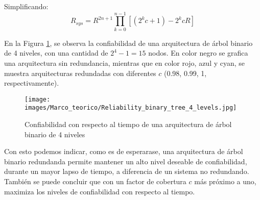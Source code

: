 Simplificando: $$R_{sys} = R^{2n +1} \prod_{k=0}^{n-1}{[(2^kc+1) - 2^kcR]}$$

En la Figura \ref{fig:Reliability_binary_tree_4_levels}, se observa la confiabilidad de una 
arquitectura de árbol binario de 4 niveles, con una cantidad de $2^4 -1 = 15$ nodos. En color negro 
se grafica una arquitectura sin redundancia, mientras que en color rojo, azul y cyan, se muestra 
arquitecturas redundadas con diferentes $c$ (0.98, 0.99, 1, respectivamente). 

\begin{figure}[h]
 \centering
 \texttt{[image: images/Marco\_teorico/Reliability\_binary\_tree\_4\_levels.jpg]}
  \caption{Confiabilidad con respecto al tiempo de una arquitectura de árbol binario de 4 niveles}  
\label{fig:Reliability_binary_tree_4_levels} 
\end{figure}

Con esto podemos indicar, como es de esperarase, una arquitectura de árbol binario redundanda 
permite mantener un alto nivel deseable de confiabilidad, durante un mayor lapso de tiempo, a 
diferencia de un sistema no redundando. También se puede concluir que con un factor de cobertura $c$
más próximo a uno, maximiza los niveles de confiabilidad con respecto al tiempo. 


